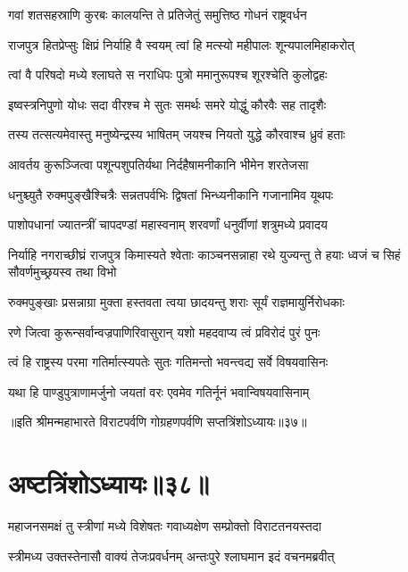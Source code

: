 \twolineshloka
{गवां शतसहस्राणि कुरबः कालयन्ति ते}
{प्रतिजेतुं समुत्तिष्ठ गोधनं राष्ट्रवर्धन}


\twolineshloka
{राजपुत्र हितप्रेप्सुः क्षिप्रं निर्याहि वै स्वयम्}
{त्वां हि मत्स्यो महीपालः शून्यपालमिहाकरोत्}


\twolineshloka
{त्वां वै परिषदो मध्ये श्लाघते स नराधिपः}
{पुत्रो ममानुरूपश्च शूरश्चेति कुलोद्वहः}


\twolineshloka
{इष्वस्त्रनिपुणो योधः सदा वीरश्च मे सुतः}
{समर्थः समरे योद्धुं कौरवैः सह तादृशैः}


\twolineshloka
{तस्य तत्सत्यमेवास्तु मनुष्येन्द्रस्य भाषितम्}
{जयश्च नियतो युद्धे कौरवाश्च ध्रुवं हताः}


\twolineshloka
{आवर्तय कुरूञ्जित्वा पशून्पशुपतिर्यथा}
{निर्दहैषामनीकानि भीमेन शरतेजसा}


\twolineshloka
{धनुश्च्युतै रुक्मपुङ्खैश्चित्रैः सन्नतपर्वभिः}
{द्विषतां भिन्ध्यनीकानि गजानामिव यूथपः}


\twolineshloka
{पाशोपधानां ज्यातन्त्रीं चापदण्डां महास्वनाम्}
{शरवर्णां धनुर्वीणां शत्रुमध्ये प्रवादय}


\threelineshloka
{निर्याहि नगराच्छीघ्रं राजपुत्र किमास्यते}
{श्वेताः काञ्चनसन्नाहा रथे युज्यन्तु ते हयाः}
{ध्वजं च सिहं सौवर्णमुच्छ्रयस्व तथा विभो}


\twolineshloka
{रुक्मपुङ्खाः प्रसन्नाग्रा मुक्ता हस्तवता त्वया}
{छादयन्तु शराः सूर्यं राज्ञमायुर्निरोधकाः}


\twolineshloka
{रणे जित्वा कुरून्सर्वान्वज्रपाणिरिवासुरान्}
{यशो महदवाप्य त्वं प्रविरोदं पुरं पुनः}


\twolineshloka
{त्वं हि राष्ट्रस्य परमा गतिर्मात्स्यपतेः सुतः}
{गतिमन्तो भवन्त्वद्य सर्वे विषयवासिनः}


\twolineshloka
{यथा हि पाण्डुपुत्राणामर्जुनो जयतां वरः}
{एवमेव गतिर्नूनं भवान्विषयवासिनाम्}

॥इति श्रीमन्महाभारते विराटपर्वणि गोग्रहणपर्वणि सप्तत्रिंशोऽध्यायः॥३७॥

\chapter{अष्टत्रिंशोऽध्यायः॥३८॥}

\twolineshloka
{महाजनसमक्षं तु स्त्रीणां मध्ये विशेषतः}
{गवाध्यक्षेण सम्प्रोक्तो विराटतनयस्तदा}


\twolineshloka
{स्त्रीमध्य उक्तस्तेनासौ वाक्यं तेजःप्रवर्धनम्}
{अन्तःपुरे श्लाघमान इदं वचनमब्रवीत्}




